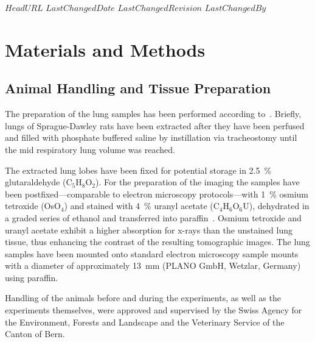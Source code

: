 \svnidlong
{$HeadURL$}
{$LastChangedDate$}
{$LastChangedRevision$}
{$LastChangedBy$}

\ifhtml
\else
\begin{center}
\end{center}
\fi

\section{Materials and Methods}
\label{sec:materials and methods}
\subsection{Animal Handling and Tissue Preparation}
The preparation of the lung samples has been performed according to~\citet{Schittny1997,Schittny1998}. Briefly, lungs of Sprague-Dawley rats have been extracted after they have been perfused and filled with phosphate buffered saline by instillation via tracheostomy until the mid respiratory lung volume was reached.

\cbstart
The extracted lung lobes have been fixed for potential storage in \SI{2.5}{\percent} glutaraldehyde (C$_5$H$_8$O$_2$). For the preparation of the imaging the samples have been postfixed---comparable to electron microscopy protocols---with \SI{1}{\percent} osmium tetroxide (OsO$_4$) and stained with \SI{4}{\percent} uranyl acetate (C$_4$H$_6$O$_6$U), dehydrated in a graded series of ethanol and transferred into paraffin~\cite{Schittny1997,Schittny1998}. Osmium tetroxide and uranyl acetate exhibit a higher absorption for x-rays than the unstained lung tissue, thus enhancing the contrast of the resulting tomographic images. The lung samples have been mounted onto standard electron microscopy sample mounts with a diameter of approximately \SI{13}{\milli\meter} (PLANO GmbH, Wetzlar, Germany) using paraffin.
\cbend

Handling of the animals before and during the experiments, as well as the experiments themselves, were approved and supervised by the Swiss Agency for the Environment, Forests and Landscape and the Veterinary Service of the Canton of Bern.


